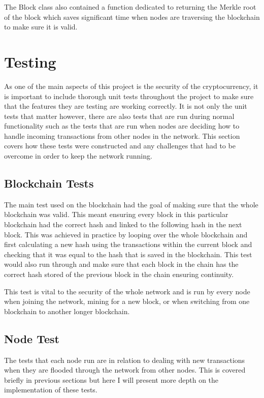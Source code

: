 \documentclass{l4proj}
\begin{document}
The Block class also contained a function dedicated to returning the Merkle root of the block which saves 
significant time when nodes are traversing the blockchain to make sure it is valid.

\section{Testing}
As one of the main aspects of this project is the security of the cryptocurrency, it is important to include
thorough unit tests throughout the project to make sure that the features they are testing are working correctly.
It is not only the unit tests that matter however, there are also tests that are run during normal functionality
such as the tests that are run when nodes are deciding how to handle incoming transactions from other nodes in the
network. This section covers how these tests were constructed and any challenges that had to be overcome in order
to keep the network running.

\subsection{Blockchain Tests}
\label{sec:blockchain}
The main test used on the blockchain had the goal of making sure that the whole blockchain was valid. This meant
ensuring every block in this particular blockchain had the correct hash and linked to the following hash in the next block.
This was achieved in practice by looping over the whole blockchain and first calculating a new hash using the 
transactions within the current block and checking that it was equal to the hash that is saved in the 
blockchain. This test would also run through and make sure that each block in the chain has the correct hash
stored of the previous block in the chain ensuring continuity.

This test is vital to the security of the whole network and is run by every node when joining the network,
mining for a new block, or when switching from one blockchain to another longer blockchain.

\subsection{Node Test}
The tests that each node run are in relation to dealing with new transactions when they are flooded through
the network from other nodes. This is covered briefly in previous sections but here I will present more depth
on the implementation of these tests.
\end{document}
